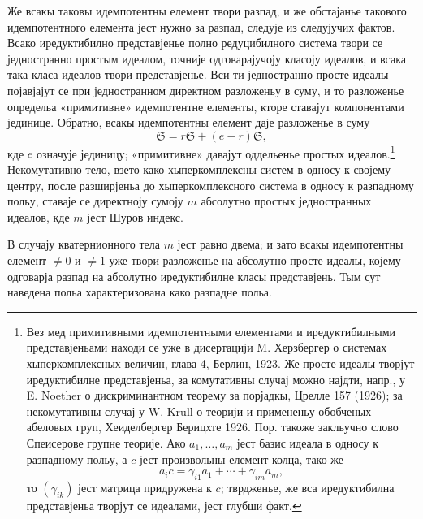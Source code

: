 ﻿\documentclass[11pt]{article}
\newcommand{\mS}{\mathfrak{S}}
\begin{document}
\noindent Же всакы таковы идемпотентны елемент твори разпад, и же обстајанье такового идемпотентного елемента јест нужно за разпад, следује из следујучих фактов. Всако иредуктибилно представјенье полно редуцибилного система твори се једностранно простым идеалом, точније одговарајучоју класоју идеалов, и всака така класа идеалов твори представјенье. Вси ти једностранно просте идеалы појавјајут се при једностранном директном разложеньу в суму, и то разложенье определьа «примитивне» идемпотентне елементы, кторе ставајут компонентами јединице. Обратно, всакы идемпотентны елемент даје разложенье в суму
\[
        \mS=r\mS+(e-r)\mS,
\]
кде $e$ означује јединицу; «примитивне» давајут оддельенье простых идеалов.\footnote{Вез мед примитивными идемпотентными елементами и иредуктибилными представјеньами находи се уже в дисертацији M. Херзбергер о системах хыперкомплексных величин, глава 4, Берлин, 1923. Же просте идеалы творјут иредуктибилне представјеньа, за комутативны случај можно најдти, напр., у E. Noether о дискриминантном теорему за порјадкы, Црелле 157 (1926); за некомутативны случај у W. Krull о теорији и примененьу обобченых абеловых груп, Хеиделбергер Берицхте 1926. Пор. такоже закльучно слово Спеисерове групне теорије. Ако $a_1,\ldots,a_m$ јест базис идеала в односу к разпадному польу, а $c$ јест произвольны елемент колца, тако же
\[
        a_i c=\gamma_{i1}a_1+\cdots+\gamma_{im}a_m,
\]
то $(\gamma_{ik})$ јест матрица придружена к $c$; тврдженье, же вса иредуктибилна представјеньа творјут се идеалами, јест глубши факт.} Некомутативно тело, взето како хыперкомплексны систем в односу к својему центру, после разширјеньа до хыперкомплексного система в односу к разпадному польу, ставаје се директноју сумоју $m$ абсолутно простых једностранных идеалов, кде $m$ јест Шуров индекс.

\medskip

\noindent В случају кватернионного тела $m$ јест равно двема; и зато всакы идемпотентны елемент $\ne0$ и $\ne1$ уже твори разложенье на абсолутно просте идеалы, којему одговарја разпад на абсолутно иредуктибилне класы представјень. Тым сут наведена польа характеризована како разпадне польа.
\end{document}
